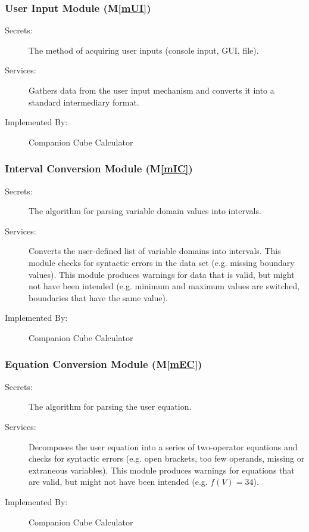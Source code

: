 \documentclass[12pt, titlepage]{article}
\newcommand{\mref}[1]{M\ref{#1}}
\newcommand{\progname}{Companion Cube Calculator} %
\begin{document}
\subsubsection{User Input Module (\mref{mUI})}

\begin{description}
\item[Secrets:] The method of acquiring user inputs (console input, GUI, file).
\item[Services:] Gathers data from the user input mechanism and converts it 
into a standard intermediary format.
\item[Implemented By:] \progname{}
\end{description}

\subsubsection{Interval Conversion Module (\mref{mIC})}

\begin{description}
	\item[Secrets:]The algorithm for parsing variable domain values into 
	intervals.
	\item[Services:]Converts the user-defined list of variable domains into 
	intervals. This module checks for syntactic errors in the data set (e.g. 
	missing boundary values). This module produces warnings for data that is 
	valid, but might not have been intended (e.g. minimum and maximum values 
	are switched, boundaries that have the same value).
	\item[Implemented By:] \progname{}
\end{description}

\subsubsection{Equation Conversion Module (\mref{mEC})}

\begin{description}
	\item[Secrets:]The algorithm for parsing the user equation.
	\item[Services:]Decomposes the user equation into a series of two-operator 
	equations and checks for syntactic errors (e.g. open brackets, too few 
	operands, missing or extraneous variables). This module produces warnings 
	for equations that are valid, but might not have been intended (e.g. $f(V) 
	= 34$).
	\item[Implemented By:] \progname{}
\end{description}
\end{document}
